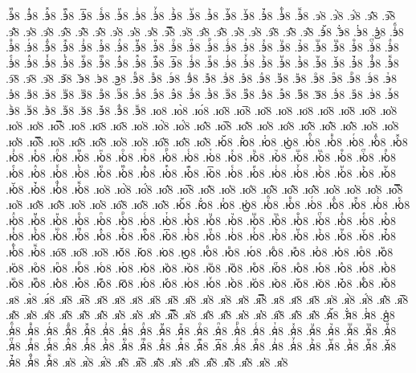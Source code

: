{.э҅ⷼ8
.э҅ⷽ8
.э҅ⷾ8
.э҅ⷿ8
.э҅꙯8
.э҅ꙴ8
.э҅ꙵ8
.э҅ꙶ8
.э҅ꙷ8
.э҅ꙸ8
.э҅ꙹ8
.э҅ꙺ8
.э҅ꙻ8
.э҅꙼8
.э҅꙽8
.э҅ꚞ8
.э҅ꚟ8
.э҆8
.э҆̀8
.э҆́8
.э҆̂8
.э҆̅8
.э҆̆8
.э҆̇8
.э҆̈8
.э҆̋8
.э҆̏8
.э҆̑8
.э҆̓8
.э҆̔8
.э҆̾8
.э҆̿8
.э҆͘8
.э҆҃8
.э҆҄8
.э҆҅8
.э҆҆8
.э҆҇8
.э҆᷀8
.э҆᷁8
.э҆᷶8
.э᷷҆8
.э᷸҆8
.э᷹҆8
.э҆ⷠ8
.э҆ⷡ8
.э҆ⷢ8
.э҆ⷣ8
.э҆ⷤ8
.э҆ⷥ8
.э҆ⷦ8
.э҆ⷧ8
.э҆ⷨ8
.э҆ⷩ8
.э҆ⷪ8
.э҆ⷫ8
.э҆ⷬ8
.э҆ⷭ8
.э҆ⷮ8
.э҆ⷯ8
.э҆ⷰ8
.э҆ⷱ8
.э҆ⷲ8
.э҆ⷳ8
.э҆ⷴ8
.э҆ⷵ8
.э҆ⷶ8
.э҆ⷷ8
.э҆ⷸ8
.э҆ⷹ8
.э҆ⷺ8
.э҆ⷻ8
.э҆ⷼ8
.э҆ⷽ8
.э҆ⷾ8
.э҆ⷿ8
.э҆꙯8
.э҆ꙴ8
.э҆ꙵ8
.э҆ꙶ8
.э҆ꙷ8
.э҆ꙸ8
.э҆ꙹ8
.э҆ꙺ8
.э҆ꙻ8
.э҆꙼8
.э҆꙽8
.э҆ꚞ8
.э҆ꚟ8
.э҇8
.э᷀8
.э᷁8
.э᷶8
.э᷷8
.э᷸8
.э᷹8
.эⷠ8
.эⷡ8
.эⷢ8
.эⷣ8
.эⷤ8
.эⷥ8
.эⷦ8
.эⷧ8
.эⷨ8
.эⷩ8
.эⷪ8
.эⷫ8
.эⷬ8
.эⷭ8
.эⷮ8
.эⷯ8
.эⷰ8
.эⷱ8
.эⷲ8
.эⷳ8
.эⷴ8
.эⷵ8
.эⷶ8
.эⷷ8
.эⷸ8
.эⷹ8
.эⷺ8
.эⷻ8
.эⷼ8
.эⷽ8
.эⷾ8
.эⷿ8
.э꙯8
.эꙴ8
.эꙵ8
.эꙶ8
.эꙷ8
.эꙸ8
.эꙹ8
.эꙺ8
.эꙻ8
.э꙼8
.э꙽8
.эꚞ8
.эꚟ8
.ю8
.ю̀8
.ю́8
.ю̂8
.ю̅8
.ю̆8
.ю̇8
.ю̈8
.ю̋8
.ю̏8
.ю̑8
.ю̓8
.ю̔8
.ю̾8
.ю̿8
.ю͘8
.ю҃8
.ю҄8
.ю҅8
.ю҅̀8
.ю҅́8
.ю҅̂8
.ю҅̅8
.ю҅̆8
.ю҅̇8
.ю҅̈8
.ю҅̋8
.ю҅̏8
.ю҅̑8
.ю҅̓8
.ю҅̔8
.ю҅̾8
.ю҅̿8
.ю҅͘8
.ю҅҃8
.ю҅҄8
.ю҅҅8
.ю҅҆8
.ю҅҇8
.ю҅᷀8
.ю҅᷁8
.ю҅᷶8
.ю᷷҅8
.ю᷸҅8
.ю᷹҅8
.ю҅ⷠ8
.ю҅ⷡ8
.ю҅ⷢ8
.ю҅ⷣ8
.ю҅ⷤ8
.ю҅ⷥ8
.ю҅ⷦ8
.ю҅ⷧ8
.ю҅ⷨ8
.ю҅ⷩ8
.ю҅ⷪ8
.ю҅ⷫ8
.ю҅ⷬ8
.ю҅ⷭ8
.ю҅ⷮ8
.ю҅ⷯ8
.ю҅ⷰ8
.ю҅ⷱ8
.ю҅ⷲ8
.ю҅ⷳ8
.ю҅ⷴ8
.ю҅ⷵ8
.ю҅ⷶ8
.ю҅ⷷ8
.ю҅ⷸ8
.ю҅ⷹ8
.ю҅ⷺ8
.ю҅ⷻ8
.ю҅ⷼ8
.ю҅ⷽ8
.ю҅ⷾ8
.ю҅ⷿ8
.ю҅꙯8
.ю҅ꙴ8
.ю҅ꙵ8
.ю҅ꙶ8
.ю҅ꙷ8
.ю҅ꙸ8
.ю҅ꙹ8
.ю҅ꙺ8
.ю҅ꙻ8
.ю҅꙼8
.ю҅꙽8
.ю҅ꚞ8
.ю҅ꚟ8
.ю҆8
.ю҆̀8
.ю҆́8
.ю҆̂8
.ю҆̅8
.ю҆̆8
.ю҆̇8
.ю҆̈8
.ю҆̋8
.ю҆̏8
.ю҆̑8
.ю҆̓8
.ю҆̔8
.ю҆̾8
.ю҆̿8
.ю҆͘8
.ю҆҃8
.ю҆҄8
.ю҆҅8
.ю҆҆8
.ю҆҇8
.ю҆᷀8
.ю҆᷁8
.ю҆᷶8
.ю᷷҆8
.ю᷸҆8
.ю᷹҆8
.ю҆ⷠ8
.ю҆ⷡ8
.ю҆ⷢ8
.ю҆ⷣ8
.ю҆ⷤ8
.ю҆ⷥ8
.ю҆ⷦ8
.ю҆ⷧ8
.ю҆ⷨ8
.ю҆ⷩ8
.ю҆ⷪ8
.ю҆ⷫ8
.ю҆ⷬ8
.ю҆ⷭ8
.ю҆ⷮ8
.ю҆ⷯ8
.ю҆ⷰ8
.ю҆ⷱ8
.ю҆ⷲ8
.ю҆ⷳ8
.ю҆ⷴ8
.ю҆ⷵ8
.ю҆ⷶ8
.ю҆ⷷ8
.ю҆ⷸ8
.ю҆ⷹ8
.ю҆ⷺ8
.ю҆ⷻ8
.ю҆ⷼ8
.ю҆ⷽ8
.ю҆ⷾ8
.ю҆ⷿ8
.ю҆꙯8
.ю҆ꙴ8
.ю҆ꙵ8
.ю҆ꙶ8
.ю҆ꙷ8
.ю҆ꙸ8
.ю҆ꙹ8
.ю҆ꙺ8
.ю҆ꙻ8
.ю҆꙼8
.ю҆꙽8
.ю҆ꚞ8
.ю҆ꚟ8
.ю҇8
.ю᷀8
.ю᷁8
.ю᷶8
.ю᷷8
.ю᷸8
.ю᷹8
.юⷠ8
.юⷡ8
.юⷢ8
.юⷣ8
.юⷤ8
.юⷥ8
.юⷦ8
.юⷧ8
.юⷨ8
.юⷩ8
.юⷪ8
.юⷫ8
.юⷬ8
.юⷭ8
.юⷮ8
.юⷯ8
.юⷰ8
.юⷱ8
.юⷲ8
.юⷳ8
.юⷴ8
.юⷵ8
.юⷶ8
.юⷷ8
.юⷸ8
.юⷹ8
.юⷺ8
.юⷻ8
.юⷼ8
.юⷽ8
.юⷾ8
.юⷿ8
.ю꙯8
.юꙴ8
.юꙵ8
.юꙶ8
.юꙷ8
.юꙸ8
.юꙹ8
.юꙺ8
.юꙻ8
.ю꙼8
.ю꙽8
.юꚞ8
.юꚟ8
.я8
.я̀8
.я́8
.я̂8
.я̅8
.я̆8
.я̇8
.я̈8
.я̋8
.я̏8
.я̑8
.я̓8
.я̔8
.я̾8
.я̿8
.я͘8
.я҃8
.я҄8
.я҅8
.я҅̀8
.я҅́8
.я҅̂8
.я҅̅8
.я҅̆8
.я҅̇8
.я҅̈8
.я҅̋8
.я҅̏8
.я҅̑8
.я҅̓8
.я҅̔8
.я҅̾8
.я҅̿8
.я҅͘8
.я҅҃8
.я҅҄8
.я҅҅8
.я҅҆8
.я҅҇8
.я҅᷀8
.я҅᷁8
.я҅᷶8
.я᷷҅8
.я᷸҅8
.я᷹҅8
.я҅ⷠ8
.я҅ⷡ8
.я҅ⷢ8
.я҅ⷣ8
.я҅ⷤ8
.я҅ⷥ8
.я҅ⷦ8
.я҅ⷧ8
.я҅ⷨ8
.я҅ⷩ8
.я҅ⷪ8
.я҅ⷫ8
.я҅ⷬ8
.я҅ⷭ8
.я҅ⷮ8
.я҅ⷯ8
.я҅ⷰ8
.я҅ⷱ8
.я҅ⷲ8
.я҅ⷳ8
.я҅ⷴ8
.я҅ⷵ8
.я҅ⷶ8
.я҅ⷷ8
.я҅ⷸ8
.я҅ⷹ8
.я҅ⷺ8
.я҅ⷻ8
.я҅ⷼ8
.я҅ⷽ8
.я҅ⷾ8
.я҅ⷿ8
.я҅꙯8
.я҅ꙴ8
.я҅ꙵ8
.я҅ꙶ8
.я҅ꙷ8
.я҅ꙸ8
.я҅ꙹ8
.я҅ꙺ8
.я҅ꙻ8
.я҅꙼8
.я҅꙽8
.я҅ꚞ8
.я҅ꚟ8
.я҆8
.я҆̀8
.я҆́8
.я҆̂8
.я҆̅8
.я҆̆8
.я҆̇8
.я҆̈8
.я҆̋8
.я҆̏8
.я҆̑8
.я҆̓8
.я҆̔8
}
